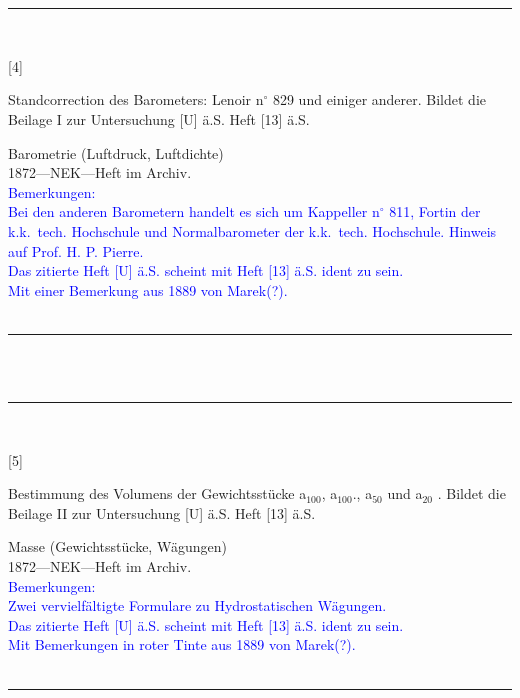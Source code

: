 \\
\vspace*{-2.5pt}\\
\parbox{\textwidth}{%
\rule{\textwidth}{1pt}\vspace*{-3mm}\\
\begin{minipage}[t]{0.1\textwidth}\vspace{0pt}
\Huge\rule[-4mm]{0cm}{1cm}[4]
\end{minipage}
\hfill
\begin{minipage}[t]{0.9\textwidth}\vspace{0pt}
\large Standcorrection des Barometers: Lenoir n{$^\circ$} 829 und einiger anderer. Bildet die Beilage I zur Untersuchung [U] ä.S. Heft [13] ä.S.\rule[-2mm]{0mm}{2mm}
\end{minipage}
{\footnotesize\flushright
Barometrie (Luftdruck, Luftdichte)\\
}
1872\quad---\quad NEK\quad---\quad Heft im Archiv.\\
\textcolor{blue}{Bemerkungen:\\{}
Bei den anderen Barometern handelt es sich um Kappeller n{$^\circ$} 811, Fortin der k.k.\ tech. Hochschule und Normalbarometer der k.k.\ tech. Hochschule. Hinweis auf Prof. H. P. Pierre.\\{}
Das zitierte Heft [U] ä.S. scheint mit Heft [13] ä.S. ident zu sein.\\{}
Mit einer Bemerkung aus 1889 von Marek(?).\\{}
}
\\[-15pt]
\rule{\textwidth}{1pt}
}
\\
\vspace*{-2.5pt}\\
\parbox{\textwidth}{%
\rule{\textwidth}{1pt}\vspace*{-3mm}\\
\begin{minipage}[t]{0.1\textwidth}\vspace{0pt}
\Huge\rule[-4mm]{0cm}{1cm}[5]
\end{minipage}
\hfill
\begin{minipage}[t]{0.9\textwidth}\vspace{0pt}
\large Bestimmung des Volumens der Gewichtsstücke a$_\mathrm{100}$, a$_\mathrm{100}$., a$_\mathrm{50}$ und a$_\mathrm{20}$ . Bildet die Beilage II zur Untersuchung [U] ä.S. Heft [13] ä.S.\rule[-2mm]{0mm}{2mm}
\end{minipage}
{\footnotesize\flushright
Masse (Gewichtsstücke, Wägungen)\\
}
1872\quad---\quad NEK\quad---\quad Heft im Archiv.\\
\textcolor{blue}{Bemerkungen:\\{}
Zwei vervielfältigte Formulare zu Hydrostatischen Wägungen.\\{}
Das zitierte Heft [U] ä.S. scheint mit Heft [13] ä.S. ident zu sein.\\{}
Mit Bemerkungen in roter Tinte aus 1889 von Marek(?).\\{}
}
\\[-15pt]
\rule{\textwidth}{1pt}
}
